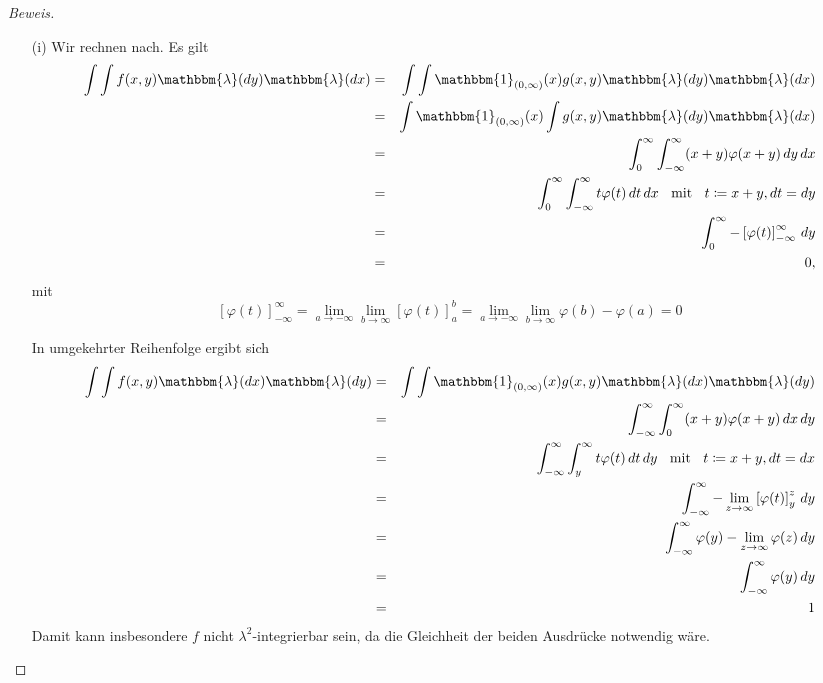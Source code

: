 \documentclass[10pt]{article}
\begin{document}
\begin{proof}[Beweis]
\begin{itemize}
\item[(i)] Wir rechnen nach. Es gilt
\begin{eqnarray*}
\int \int f(x,y) \mathbbm{\lambda}(dy) \mathbbm{\lambda}(dx) &=& \int \int \mathbbm{1}_{(0,\infty)}(x)g(x,y) \mathbbm{\lambda}(dy) \mathbbm{\lambda}(dx) \\
											     &=& \int \mathbbm{1}_{(0,\infty)}(x) \int g(x,y) \mathbbm{\lambda}(dy) \mathbbm{\lambda}(dx) \\
											     &=& \int_{0}^{\infty} \int_{-\infty}^{\infty} (x+y)\varphi(x+y) \, dy \,dx \\
											     &=& \int_{0}^{\infty}  \int_{-\infty}^{\infty} t \varphi(t) \,dt \, dx \;\; \text{ mit } \;\; t \coloneqq x+y, dt = dy \\
											     &=& \int_{0}^{\infty} -\left[ \varphi(t)\right]_{-\infty}^{\infty} \, dy \\
											     &=& 0,
\end{eqnarray*}
mit
$$
\left[ \varphi(t)\right]_{-\infty}^{\infty} = \lim_{a \to -\infty}  \lim_{b \to \infty} \left[ \varphi(t)\right]_{a}^{b} =  \lim_{a \to -\infty}  \lim_{b \to \infty} \varphi(b) - \varphi(a) = 0
$$


In umgekehrter Reihenfolge ergibt sich
\begin{eqnarray*}
\int \int f(x,y) \mathbbm{\lambda}(dx) \mathbbm{\lambda}(dy) &=& \int \int \mathbbm{1}_{(0,\infty)}(x)g(x,y) \mathbbm{\lambda}(dx) \mathbbm{\lambda}(dy) \\
											     &=& \int_{-\infty}^{\infty} \int_{0}^{\infty} (x+y)\varphi(x+y) \, dx \,dy \\
											     &=& \int_{-\infty}^{\infty}  \int_{y}^{\infty} t \varphi(t) \,dt \, dy \;\; \text{ mit } \;\; t \coloneqq x+y, dt = dx \\
											     &=& \int_{-\infty}^{\infty} - \lim_{z \to \infty} \left[\varphi(t) \right]_{y}^{z} \,dy \\
											     &=& \int_{-\infty}^{\infty} \varphi(y) - \lim_{z \to \infty} \varphi(z) \,dy \\
											     &=& \int_{-\infty}^{\infty} \varphi(y)  \,dy \\
											     &=& 1
\end{eqnarray*}
Damit kann insbesondere $f$ nicht $\lambda^2$-integrierbar sein, da die Gleichheit der beiden Ausdrücke notwendig wäre.


\end{itemize}
\end{proof}
\end{document}

